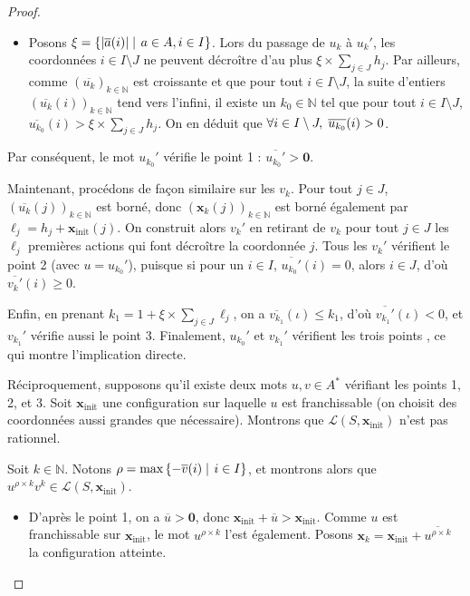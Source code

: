 \documentclass[a4paper,final]{article}
\theoremstyle{definition}
\let\leq\leqslant
\let\geq\geqslant
\newcommand{\set}[2]{\left\{#1\mathrel{\left|\vphantom{#1}\vphantom{#2}\right.}#2\right\}}
\newcommand{\abs}[1]{\ensuremath{\displaystyle\left\lvert #1 \right\rvert}}
\newcommand{\N}{\ensuremath{\mathbb{N}}}
\newcommand{\lang}{\ensuremath{\mathcal{L}}}
\newcommand{\vect}[1]{\ensuremath{\mathbf{#1}}}
\newcommand{\xinit}{\ensuremath{\vect{x}_\text{init}}}
\newcommand{\valeur}[1]{\ensuremath{\overline{#1}}}
\begin{document}
\begin{proof}
\begin{itemize}
    \item Posons $\xi = \set{\abs{\valeur{a}(i)}} {a\in A,i\in I}$.
    Lors du passage de $u_k$ à $u_k'$, les coordonnées $i\in I\setminus J$ ne peuvent décroître d'au plus $\xi \times \sum_{j\in J} h_j$.
    Par ailleurs, comme $(\valeur{u_k})_{k\in\N}$ est croissante et que pour tout $i\in I\setminus J$, la suite d'entiers $(\valeur{u_k}(i))_{k\in\N}$ tend vers l'infini, 
    il existe un $k_0\in\N$ tel que pour tout $i\in I\setminus J$, $\valeur{u_{k_0}}(i) > \xi \times \sum_{j\in J} h_j$.
    On en déduit que $\forall i\in I\setminus J, \hspace{1mm} \valeur{u_{k_0}}(i) > 0$.
\end{itemize}
Par conséquent, le mot $u_{k_0}'$ vérifie le point 1 %
: $\valeur{u_{k_0}'} > \vect{0}$.
\vspace{2mm}

Maintenant, procédons de façon similaire sur les $v_k$.
Pour tout $j\in J$, $(\valeur{u_k}(j))_{k\in\N}$ est borné, donc $(\vect{x}_k(j))_{k\in\N}$ est borné également par $\ell_j = h_j + \xinit(j)$.
On construit alors $v_k'$ en retirant de $v_k$ pour tout $j\in J$ les $\ell_j$ premières actions qui font décroître la coordonnée $j$.
Tous les $v_k'$ vérifient le point 2 (avec $u = u_{k_0}'$), puisque si pour un $i\in I$, $\valeur{u_{k_0}'}(i) = 0$, alors $i\in J$, d'où $\valeur{v_k'}(i) \geq 0$.

Enfin, en prenant $k_1 = 1 + \xi \times \sum_{j\in J} \ell_j$, on a $\valeur{v_{k_1}}(\iota) \leq k_1$, d'où $\valeur{v_{k_1}'}(\iota) < 0$, et $v_{k_1}'$ vérifie aussi le point 3.
Finalement, $u_{k_0}'$ et $v_{k_1}'$ vérifient les trois points %
, ce qui montre l'implication directe.
\vspace{5mm}

Réciproquement, supposons qu'il existe deux mots $u,v\in A^*$ vérifiant les points 1, 2, et 3.
Soit $\xinit$ une configuration sur laquelle $u$ est franchissable (on choisit des coordonnées aussi grandes que nécessaire).
Montrons que $\lang(S,\xinit)$ n'est pas rationnel.

Soit $k\in\N$.
Notons $\rho = \text{max}\set{-\valeur{v}(i)}{i\in I}$, 
et montrons alors que $u^{\rho\times k} v^k \in \lang(S,\xinit)$.

\begin{itemize}
    \item D'après le point 1, on a $\valeur{u} > \vect{0}$, donc $\xinit + \valeur{u} > \xinit$.
    Comme $u$ est franchissable sur $\xinit$, le mot $u^{\rho\times k}$ l'est également.
    Posons $\vect{x}_k = \xinit + \valeur{u^{\rho\times k}}$ la configuration atteinte.
    

\end{itemize}
\end{proof}
\end{document}
